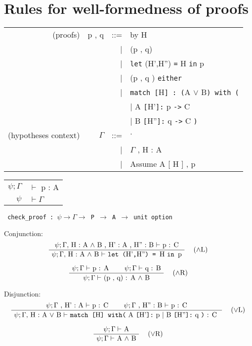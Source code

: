 \documentclass[twoside,a4paper]{article}
\begin{document}
\section{Rules for well-formedness of proofs}
\begin{center}
\begin{tabular}{rrrl}
(proofs)& p , q &::=& by H 
\\ &&|& (p , q) 
\\ &&|& {\tt let} (H',H'') {\tt =} H {\tt in} p
\\ &&|& (p , q ) {\tt either} 
\\ &&|& {\tt match [}H{\tt  ] : (}A $\vee$ B{\tt ) with (}
\\ &&&\qquad \qquad | A {\tt [}H'{\tt ]:} p {\tt ->} C 
\\ &&&\qquad \qquad | B {\tt [}H''{\tt ]:} q {\tt ->} C {\tt)}
\\
(hypotheses context)& $\Gamma$ &::=& \quad $\cdot$ \quad 
\\ &&| & $\Gamma$ , H : A
\\ &&| & Assume A [ H ] , p
\end{tabular}

\begin{tabular} {rl}
$\psi ; \Gamma$ &$\vdash$ p : A
\\
$\psi $ & $\vdash \Gamma$
\end{tabular}

{\tt
check_proof : $\psi \rightarrow \Gamma \rightarrow $ P 
$\rightarrow$ A $\rightarrow$ unit option
}
\end{center}

Conjunction:
\[
\AxiomC{$\psi ; \Gamma ,$ H : A $\wedge$ B , H' : A , H'' : B 
$\vdash$ p : C}
\RightLabel{\quad ($\wedge$L)}
\UnaryInfC{$\psi ; \Gamma ,$ H : A $\wedge$ B $\vdash$
{\tt let (}H'{\tt,}H''{\tt) = }H {\tt  in }p}
\DisplayProof
\]

\[
\AxiomC{$\psi ; \Gamma \vdash$ p : A}
\AxiomC{$\psi ; \Gamma \vdash$ q : B}
\RightLabel{\quad ($\wedge$R)}
\BinaryInfC{$\psi ; \Gamma \vdash$ (p , q) : A $\wedge$ B}
\DisplayProof
\]

Disjunction:
\[
\AxiomC{$\psi ; \Gamma$ , H' : A $\vdash$ p : C}
\AxiomC{$\psi ; \Gamma$ , H'' : B $\vdash$ p : C}
\RightLabel{\quad ($\vee$L)}
\BinaryInfC{$\psi ; \Gamma ,$  H : A 
$ \vee$ B $\vdash $
 {\tt  match [}H{\tt] with(}
 A {\tt [}H'{\tt ]:} p
 | B {\tt [}H''{\tt ]:} q {\tt)} : C
}
\DisplayProof
\]

\[
\AxiomC{$\psi ; \Gamma \vdash$ A} %
\RightLabel{\quad ($\vee$R)}
\UnaryInfC{$\psi ; \Gamma \vdash$ A $\wedge$ B}
\DisplayProof
\]
\end{document}
